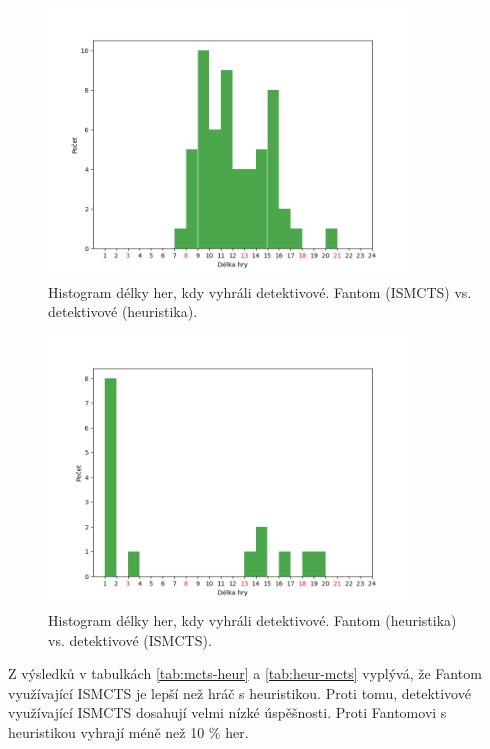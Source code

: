 \begin{figure}[h]
  \centering
  \includegraphics[width=0.85\textwidth]{mcts-heur-histogram.png}
  \caption{Histogram délky her, kdy vyhráli detektivové. Fantom (ISMCTS) vs. detektivové (heuristika).}
  \label{fig:hist-mcts-heur}
\end{figure}

\begin{figure}[h]
  \centering
  \includegraphics[width=0.85\textwidth]{heur-mcts-histogram.png}
  \caption{Histogram délky her, kdy vyhráli detektivové. Fantom (heuristika) vs. detektivové (ISMCTS).}
  \label{fig:hist-heur-mcts}
\end{figure}

Z výsledků v tabulkách \ref{tab:mcts-heur} a \ref{tab:heur-mcts} vyplývá, že Fantom využívající ISMCTS je lepší než hráč s heuristikou. Proti tomu, detektivové využívající ISMCTS dosahují velmi nízké úspěšnosti. Proti Fantomovi s heuristikou vyhrají méně než 10 \% her. 

